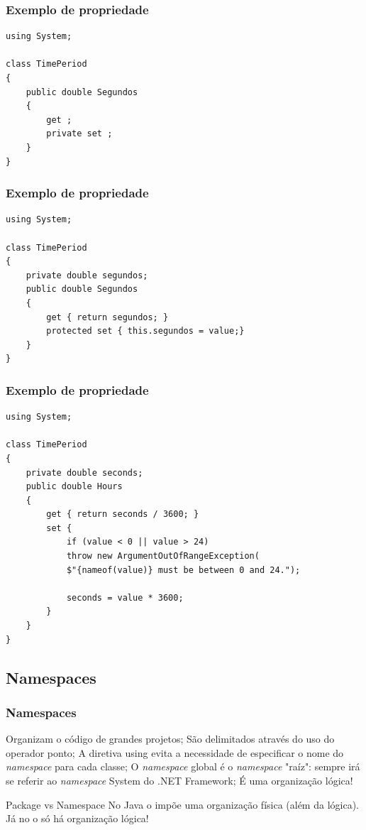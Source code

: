 \documentclass{beamer}
\begin{document}
\begin{frame}[fragile]
\frametitle{Exemplo de propriedade}
\begin{lstlisting}
using System;

class TimePeriod
{
	public double Segundos
	{
		get ;
		private set ;
	}
}
\end{lstlisting}
\end{frame}

\begin{frame}[fragile]
\frametitle{Exemplo de propriedade}
\begin{lstlisting}
using System;

class TimePeriod
{
	private double segundos;	
	public double Segundos
	{
		get { return segundos; }
		protected set { this.segundos = value;} 
	}
}
\end{lstlisting}
\end{frame}


\begin{frame}[fragile]
\frametitle{Exemplo de propriedade}
\begin{lstlisting}
using System;

class TimePeriod
{
	private double seconds;	
	public double Hours
	{
		get { return seconds / 3600; }
		set { 
			if (value < 0 || value > 24)
			throw new ArgumentOutOfRangeException(
			$"{nameof(value)} must be between 0 and 24.");
			
			seconds = value * 3600; 
		}
	}
}
\end{lstlisting}
\end{frame}



\subsection{Namespaces}

\begin{frame}
\frametitle{Namespaces}
\begin{outline}
	\1 Organizam o código de grandes projetos;
	\1 São delimitados através do uso do operador ponto;
	\1 A diretiva using evita a necessidade de especificar o nome do \textit{namespace} para cada classe;
	\1 O \textit{namespace} global é o \textit{namespace} "raíz":  sempre irá se referir ao \textit{namespace} System do .NET Framework;
	\1 É uma organização lógica!
\end{outline}
\begin{block}{Package vs Namespace}
No Java o  impõe uma organização física (além da lógica). Já no \CS o  só há organização lógica!
\end{block}
\end{frame}
\end{document}
